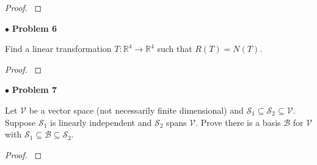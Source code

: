 \documentclass{article}
\begin{document}
\begin{proof}
$ $\newline
\end{proof}

\newpage
$ \bullet$ \textbf{Problem 6}
\medskip

\begin{itshape}
Find a linear transformation $T: \mathbb{R}^4 \to \mathbb{R}^4$ such that $R(T)=N(T)$.
\end{itshape}
\medskip

\begin{proof}
$ $\newline
\end{proof}

\newpage
$ \bullet$ \textbf{Problem 7}
\medskip

\begin{itshape}
Let $\mathcal{V}$ be a vector space (not necessarily finite dimensional) and $\mathcal{S}_1 \subseteq \mathcal{S}_2 \subseteq \mathcal{V}$. Suppose $\mathcal{S}_1$ is linearly independent and $\mathcal{S}_2$ spans $\mathcal{V}$. Prove there is a basis $\mathcal{B}$ for $\mathcal{V}$ with $\mathcal{S}_1 \subseteq \mathcal{B} \subseteq \mathcal{S}_2$.
\end{itshape}
\medskip

\begin{proof}
$ $\newline
\end{proof}
\end{document}

